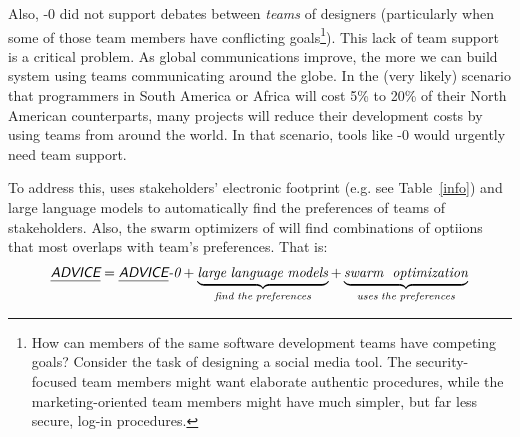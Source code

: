 \documentclass[twoside]{NSF}
\newcommand{\IT}{{\sffamily {\em \mbox{ADVICE}}}}
\newcommand{\ITS}[1]{\mbox{{\IT}-#1}}
\begin{document}
\begin{nsfdescription}
Also, \ITS{0} did not support debates between {\em teams} of designers
(particularly when some
of those team members have conflicting goals\footnote{How can members of the same
software development teams have competing goals? Consider the task of designing a social media tool. The security-focused team members might want elaborate authentic procedures, while the marketing-oriented team members might have much simpler, but far less secure, log-in procedures.}). 
This lack of team support is  a critical problem. As global
communications improve,   the more we can build system using  teams communicating  around the globe. In the (very likely) scenario that programmers in South America or Africa will cost 5\% to 20\%   of their North American counterparts,   many  projects will reduce their development costs by  using   teams from around the world.  In that scenario, tools like \ITS{0} would urgently need   team support.


To address this, 
{\IT} uses  stakeholders' electronic footprint (e.g. see   Table~\ref{info})
and  large language models
to automatically find the preferences of teams of stakeholders. Also, the swarm optimizers of {\IT}  will find   combinations of optiions that 
 most  overlaps with  team's preferences. That is:
\[
\textit{\IT} = \textit{\ITS{0}} +
\underbrace{\mathit{large\; language\; models}}_{\mathit{  find\; the \;preferences}} + 
\underbrace{\textit{swarm\; optimization}}_{\mathit{ uses\; the\; preferences}}
\]


 
 


\end{nsfdescription}
\end{document}
